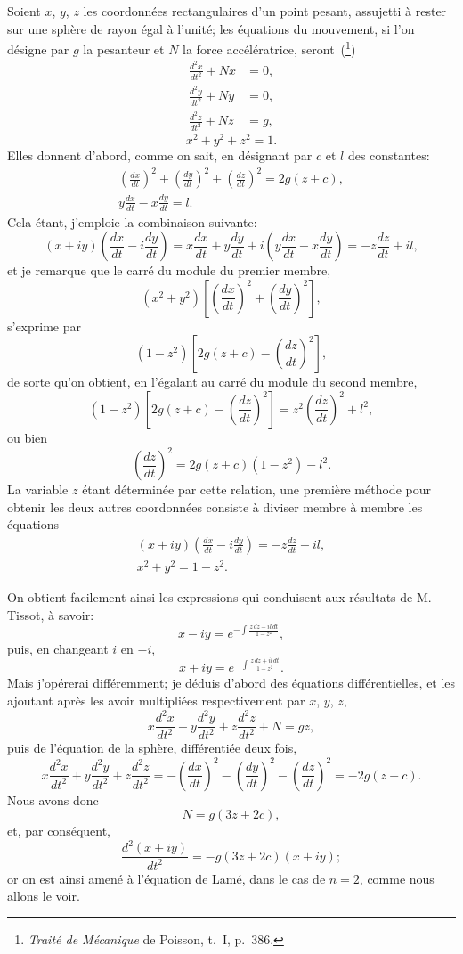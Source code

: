 \documentclass[11pt,leqno,oneside,letterpaper]{book}[2005/09/16]
\begin{document}
Soient $x$, $y$, $z$ les coordonn\'ees rectangulaires d'un point pesant, assujetti
\`a rester sur une sph\`ere de rayon \'egal \`a l'unit\'e; les \'equations du mouvement,
si l'on d\'esigne par $g$ la pesanteur et $N$ la force acc\'el\'eratrice,
seront~(\footnote{\textit{Trait\'e de M\'ecanique} de Poisson, t.~I, p.~386.})
\begin{align*}
\frac{d^2x}{dt^2} + Nx &= 0,\\
\frac{d^2y}{dt^2} + Ny &= 0,\\
\frac{d^2z}{dt^2} + Nz &= g,
\end{align*}
\[
x^2 + y^2 + z^2 = 1.
\]
Elles donnent d'abord, comme on sait, en d\'esignant par $c$ et $l$ des constantes:
\begin{gather*}
\left( \frac{dx}{dt} \right)^2 +
\left( \frac{dy}{dt} \right)^2 +
\left( \frac{dz}{dt} \right)^2 = 2g(z + c), \\
y \frac{dx}{dt} - x \frac{dy}{dt} = l.
\end{gather*}
Cela \'etant, j'emploie la combinaison suivante:
\[
(x + iy) \left( \frac{dx}{dt} - i\frac{dy}{dt} \right)
   = x\frac{dx}{dt} + y\frac{dy}{dt} + i\left( y\frac{dx}{dt} - x\frac{dy}{dt}\right)
   = -z \frac{dz}{dt} + il,
\]
et je remarque que le carr\'e du module du premier membre,
\[
(x^2 + y^2) \left[ \left( \frac{dx}{dt} \right)^2
                  + \left( \frac{dy}{dt} \right)^2 \right],
\]
s'exprime par
\[
(1 - z^2) \left[ 2g(z+c) - \left( \frac{dz}{dt} \right)^2 \right],
\]
de sorte qu'on obtient, en l'\'egalant au carr\'e du module du second membre,
\[
(1-z^2) \left[ 2g (z+c) - \left( \frac{dz}{dt} \right)^2 \right]
  = z^2 \left( \frac{dz}{dt} \right)^2 + l^2,
\]
ou bien
\[
\left( \frac{dz}{dt} \right)^2 = 2g(z+c)(1-z^2) - l^2.
\]
La variable $z$ \'etant d\'etermin\'ee par cette relation, une premi\`ere m\'ethode
pour obtenir les deux autres coordonn\'ees consiste \`a diviser membre \`a
membre les \'equations
\begin{gather*}
(x + iy)\left( \frac{dx}{dt} - i\frac{dy}{dt} \right)
= -z \frac{dz}{dt} + il,  \\
x^2 + y^2 = 1 - z^2.
\end{gather*}

On obtient facilement ainsi les expressions qui conduisent aux r\'esultats
de M. Tissot, \`a savoir:
\[
x - iy = e^{\textstyle-\int \frac{z \,dz - il \,dt}{1 - z^2}},
\]
puis, en changeant $i$ en $-i$,
\[
x + iy = e^{\textstyle-\int \frac{z \,dz + il \,dt}{1 - z^2}}.
\]
Mais j'op\'ererai diff\'eremment; je d\'eduis d'abord des \'equations diff\'erentielles,
et les ajoutant apr\`es les avoir multipli\'ees respectivement par $x$, $y$, $z$,
\[
x\frac{d^2x}{dt^2} + y\frac{d^2y}{dt^2} + z\frac{d^2z}{dt^2} + N = gz,
\]
puis de l'\'equation de la sph\`ere, diff\'erenti\'ee deux fois,
\[
x\frac{d^2x}{dt^2} + y\frac{d^2y}{dt^2} + z\frac{d^2z}{dt^2}
  = -\left( \frac{dx}{dt} \right)^2
    -\left( \frac{dy}{dt} \right)^2
    -\left( \frac{dz}{dt} \right)^2
  = -2g(z+c).
\]
Nous avons donc
\[
N = g(3z+2c),
\]
et, par cons\'equent,
\[
\frac{d^2(x+iy)}{dt^2} = -g(3z+2c)(x+iy);
\]
or on est ainsi amen\'e \`a l'\'equation de Lam\'e, dans le cas de $n = 2$, comme
nous allons le voir.
\end{document}
